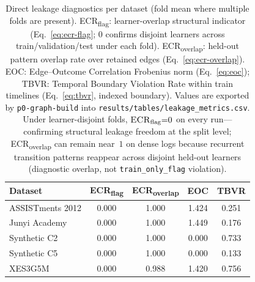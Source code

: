 \begin{table}[t]
\centering
\caption{Direct leakage diagnostics per dataset (fold mean where multiple folds are present). \textsc{ECR}\textsubscript{flag}: learner-overlap structural indicator (Eq.~\ref{eq:ecr-flag}; $0$ confirms disjoint learners across train/validation/test under each fold). \textsc{ECR}\textsubscript{overlap}: held-out pattern overlap rate over retained edges (Eq.~\ref{eq:ecr-overlap}). \textsc{EOC}: Edge--Outcome Correlation Frobenius norm (Eq.~\ref{eq:eoc}); \textsc{TBVR}: Temporal Boundary Violation Rate within train timelines (Eq.~\ref{eq:tbvr}, indexed boundary). Values are exported by \texttt{p0-graph-build} into \texttt{results/tables/leakage\_metrics.csv}. Under learner-disjoint folds, $\textsc{ECR}\textsubscript{flag}{=}0$ on every run---confirming structural leakage freedom at the split level; \textsc{ECR}\textsubscript{overlap} can remain near~$1$ on dense logs because recurrent transition patterns reappear across disjoint held-out learners (diagnostic overlap, not \texttt{train\_only\_flag} violation).}
\label{tab:leakage-metrics}
\footnotesize
\setlength{\tabcolsep}{4pt}
\begin{tabular}{@{}lcccc@{}}
\toprule
Dataset & \textsc{ECR}\textsubscript{flag} & \textsc{ECR}\textsubscript{overlap} & \textsc{EOC} & \textsc{TBVR} \\
\midrule
ASSISTments 2012 & 0.000 & 1.000 & 1.424 & 0.251 \\
Junyi Academy & 0.000 & 1.000 & 1.449 & 0.176 \\
Synthetic C2 & 0.000 & 1.000 & 0.000 & 0.733 \\
Synthetic C5 & 0.000 & 1.000 & 0.000 & 0.133 \\
XES3G5M & 0.000 & 0.988 & 1.420 & 0.756 \\
\bottomrule
\end{tabular}
\end{table}
